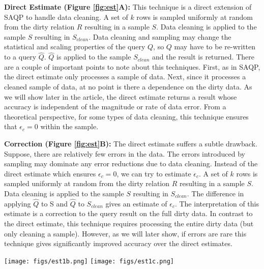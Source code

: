 \vspace{0.5em}
\noindent\textbf{Direct Estimate (Figure \ref{fig:est}A): } This technique is a direct extension of SAQP to handle data cleaning. A set of $k$ rows is sampled uniformly at random from the dirty relation $R$ resulting in a sample $S$. Data cleaning is applied to the sample $S$ resulting in $S_{clean}$.
Data cleaning and sampling may change the statistical and scaling properties of the query $Q$, so $Q$ may have to be re-written to a query $\widehat{Q}$. $\widehat{Q}$ is applied to the sample $S_{clean}$ and the result is returned. 
There are a couple of important points to note about this techniques.
First, as in SAQP, the direct estimate only processes a sample of data.
Next, since it processes a cleaned sample of data, at no point is there a dependence on the dirty data.
As we will show later in the article, the direct estimate returns a result whose accuracy is independent of the magnitude or rate of data error. 
From a theoretical perspective, for some types of data cleaning, this technique ensures that $\epsilon_c = 0$ within the sample.

\vspace{0.5em}
\noindent\textbf{Correction (Figure \ref{fig:est}B): } The direct estimate suffers a subtle drawback. Suppose, there are relatively few errors in the data. The errors introduced by sampling may dominate any error reductions due to data cleaning. Instead of the direct estimate which ensures $\epsilon_c = 0$, we can try to estimate $\epsilon_c$. A set of $k$ rows is sampled uniformly at random from the dirty relation $R$ resulting in a sample $S$. Data cleaning is applied to the sample $S$ resulting in $S_{clean}$. 
The difference in applying $\widehat{Q}$ to S and $\widehat{Q}$ to $S_{clean}$ gives an estimate of $\epsilon_c$. 
The interpretation of this estimate is a correction to the query result on the full dirty data.
In contrast to the direct estimate, this technique requires processing the entire dirty data (but only cleaning a sample).
However, as we will later show, if errors are rare this technique gives significantly improved accuracy over the direct estimates.

\begin{SCfigure}\centering
\texttt{[image: figs/est1b.png]}
\hspace{2em}
\texttt{[image: figs/est1c.png]}
\caption{Estimating query results with data cleaning on random samples. There are two ways to estimate a query result: (a) direct estimation applies the query to a sample (possibly with some scaling), and (b) correction corrects a query result on the entire dirty data.\label{fig:est}}
\end{SCfigure}

